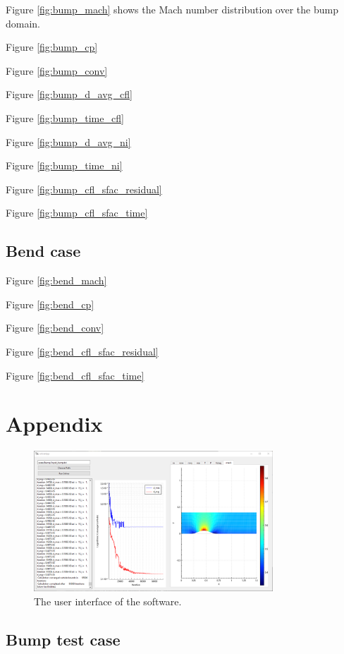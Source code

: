 \documentclass{article}
\begin{document}
Figure \ref{fig:bump_mach} shows the Mach number distribution over the bump domain.

Figure \ref{fig:bump_cp}

Figure \ref{fig:bump_conv}

Figure \ref{fig:bump_d_avg_cfl}

Figure \ref{fig:bump_time_cfl}

Figure \ref{fig:bump_d_avg_ni}

Figure \ref{fig:bump_time_ni}

Figure \ref{fig:bump_cfl_sfac_residual}

Figure \ref{fig:bump_cfl_sfac_time}

\subsection{Bend case}

Figure \ref{fig:bend_mach}

Figure \ref{fig:bend_cp}

Figure \ref{fig:bend_conv}

Figure \ref{fig:bend_cfl_sfac_residual}

Figure \ref{fig:bend_cfl_sfac_time}



\section{Appendix}

\begin{figure}[H]
    \centering
    \includegraphics[width=0.8\textwidth]{figures/software.png}
    \caption{The user interface of the software.}
    \label{fig:ui}
\end{figure}

\subsection{Bump test case}
\end{document}
